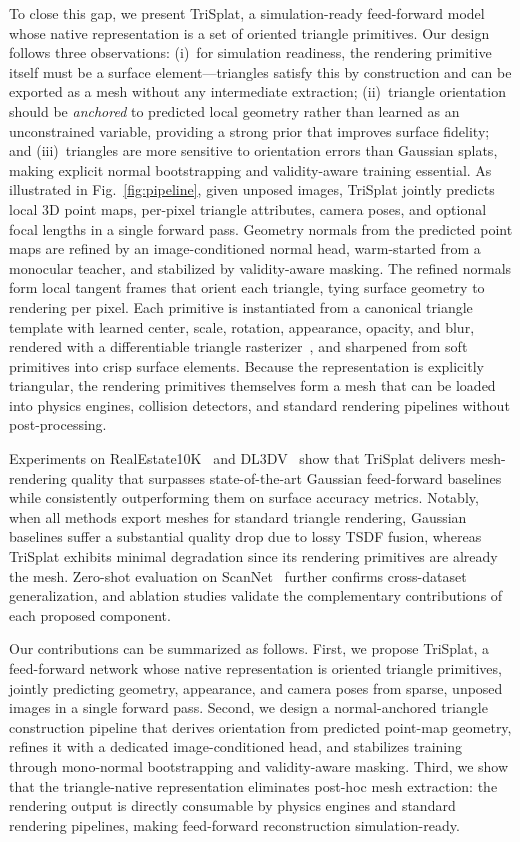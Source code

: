 \documentclass{llmxive}
\providecommand{\method}{TriSplat\xspace}
\begin{document}
To close this gap, we present \method, a simulation-ready feed-forward model whose native representation is a set of oriented triangle primitives.
Our design follows three observations:
(i)~for simulation readiness, the rendering primitive itself must be a surface element---triangles satisfy this by construction and can be exported as a mesh without any intermediate extraction;
(ii)~triangle orientation should be \emph{anchored} to predicted local geometry rather than learned as an unconstrained variable, providing a strong prior that improves surface fidelity;
and (iii)~triangles are more sensitive to orientation errors than Gaussian splats, making explicit normal bootstrapping and validity-aware training essential.
As illustrated in Fig.~\ref{fig:pipeline}, given unposed images, \method jointly predicts local 3D point maps, per-pixel triangle attributes, camera poses, and optional focal lengths in a single forward pass.
Geometry normals from the predicted point maps are refined by an image-conditioned normal head, warm-started from a monocular teacher, and stabilized by validity-aware masking.
The refined normals form local tangent frames that orient each triangle, tying surface geometry to rendering per pixel.
Each primitive is instantiated from a canonical triangle template with learned center, scale, rotation, appearance, opacity, and blur, rendered with a differentiable triangle rasterizer~\citep{Held2025Triangle}, and sharpened from soft primitives into crisp surface elements.
Because the representation is explicitly triangular, the rendering primitives themselves form a mesh that can be loaded into physics engines, collision detectors, and standard rendering pipelines without post-processing.


Experiments on RealEstate10K~\citep{zhou2018stereo} and DL3DV~\citep{ling2024dl3dv} show that \method delivers mesh-rendering quality that surpasses state-of-the-art Gaussian feed-forward baselines while consistently outperforming them on surface accuracy metrics.
Notably, when all methods export meshes for standard triangle rendering, Gaussian baselines suffer a substantial quality drop due to lossy TSDF fusion, whereas \method exhibits minimal degradation since its rendering primitives are already the mesh.
Zero-shot evaluation on ScanNet~\citep{dai2017scannet} further confirms cross-dataset generalization, and ablation studies validate the complementary contributions of each proposed component.

Our contributions can be summarized as follows.
First, we propose \method, a feed-forward network whose native representation is oriented triangle primitives, jointly predicting geometry, appearance, and camera poses from sparse, unposed images in a single forward pass.
Second, we design a normal-anchored triangle construction pipeline that derives orientation from predicted point-map geometry, refines it with a dedicated image-conditioned head, and stabilizes training through mono-normal bootstrapping and validity-aware masking.
Third, we show that the triangle-native representation eliminates post-hoc mesh extraction: the rendering output is directly consumable by physics engines and standard rendering pipelines, making feed-forward reconstruction simulation-ready.
\end{document}
